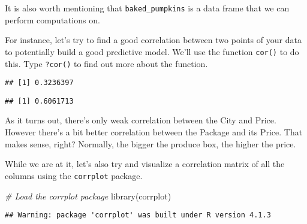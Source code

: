 \documentclass[
]{article}
\newenvironment{Shaded}{\begin{snugshade}}{\end{snugshade}}
\newcommand{\CommentTok}[1]{\textcolor[rgb]{0.56,0.35,0.01}{\textit{#1}}}
\newcommand{\FunctionTok}[1]{\textcolor[rgb]{0.00,0.00,0.00}{#1}}
\newcommand{\NormalTok}[1]{#1}
\newcommand{\SpecialCharTok}[1]{\textcolor[rgb]{0.00,0.00,0.00}{#1}}
\begin{document}
It is also worth mentioning that \texttt{baked\_pumpkins} is a data
frame that we can perform computations on.

For instance, let's try to find a good correlation between two points of
your data to potentially build a good predictive model. We'll use the
function \texttt{cor()} to do this. Type \texttt{?cor()} to find out
more about the function.

\begin{Shaded}
\end{Shaded}

\begin{verbatim}
## [1] 0.3236397
\end{verbatim}

\begin{Shaded}
\end{Shaded}

\begin{verbatim}
## [1] 0.6061713
\end{verbatim}

As it turns out, there's only weak correlation between the City and
Price. However there's a bit better correlation between the Package and
its Price. That makes sense, right? Normally, the bigger the produce
box, the higher the price.

While we are at it, let's also try and visualize a correlation matrix of
all the columns using the \texttt{corrplot} package.

\begin{Shaded}
\begin{Highlighting}[]
\CommentTok{\# Load the corrplot package}
\FunctionTok{library}\NormalTok{(corrplot)}
\end{Highlighting}
\end{Shaded}

\begin{verbatim}
## Warning: package 'corrplot' was built under R version 4.1.3
\end{verbatim}
\end{document}
